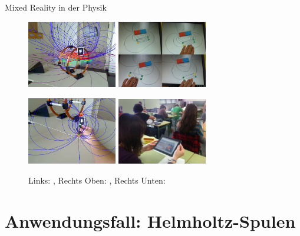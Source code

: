 \begin{frame}[fragile]{Mixed Reality in der Physik}

\begin{figure}
	\includegraphics[width=0.35\textwidth]{images/Buchau09.jpg}
	\hspace{0.05cm}
	\includegraphics[width=0.35\textwidth]{images/Matsutomo13.jpg}

	\includegraphics[width=0.35\textwidth]{images/Buchau09_Magnet.jpg}
	\hspace{0.05cm}
	\includegraphics[width=0.35\textwidth]{images/Ibanez14.jpg}

	\setlength{\abovecaptionskip}{5pt plus 5pt minus 2pt}
	\caption*{Links: \citep{Buchau09}, Rechts Oben: \cite{Matsutomo13}, Rechts Unten: \cite{Ibanez14}}
\end{figure}

\end{frame}

\part{Anwendungsfall: Helmholtz-Spulen}
\label{part:physics}

